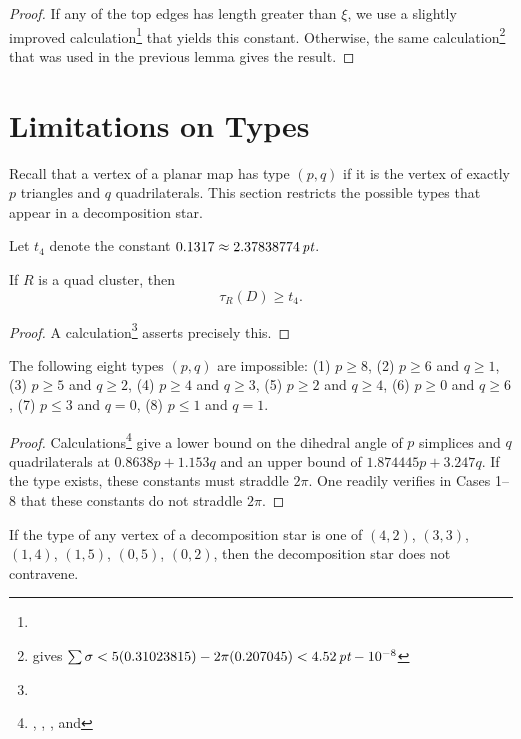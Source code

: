 \begin{proof}
If any of the top edges has length greater than $\xi$, we use a
slightly improved calculation\footnote{} that
yields this constant. Otherwise, the same
calculation\footnote{ gives
  $\sum\sigma < 5(0.31023815) - 2\pi(0.207045) < 4.52\,\hbox{\it pt} - 10^{-8}$
  } that was used
in the previous lemma gives the result.
\end{proof}


\section{Limitations on Types}

Recall that a vertex of a planar map has type $(p,q)$ if it is the
vertex of exactly $p$ triangles and $q$ quadrilaterals. This
section restricts the possible types that appear in a
decomposition star.

Let $t_4$ denote the constant $0.1317\approx 2.37838774\,\hbox{\it pt}$.

\begin{lemma}\label{lemma:0.1317} If $R$ is a quad cluster, then
   $$\tau_R(D) \ge t_4.$$
\end{lemma}

\begin{proof}
A calculation\footnote{} asserts precisely this.
\end{proof}

\begin{lemma} \label{lemma:pq-impossible}
The following eight types $(p,q)$ are impossible:
    (1)  $p\ge 8$,
    (2)  $p\ge 6$ and $q\ge 1$,
    (3)  $p \ge 5$ and $q\ge 2$,
    (4)  $p \ge 4$ and $q\ge 3$,
    (5)  $p \ge 2$ and $q\ge 4$,
    (6)  $p \ge 0$ and $q\ge 6$,
    (7)  $p \le 3$ and $q=0$,
    (8) $p \le 1$ and $q=1$.
\end{lemma}

\begin{proof}
Calculations\footnote{, ,
, and } give a lower bound on the
dihedral angle of $p$ simplices and $q$ quadrilaterals at
$0.8638p+1.153 q$ and an upper bound of $1.874445 p + 3.247 q$. If
the type exists, these constants must straddle $2\pi$. One readily
verifies in Cases 1--8 that these constants do not straddle
$2\pi$.
\end{proof}

\begin{lemma}
    \label{lemma:pq-types}
If the type of any vertex of a decomposition star is one of
$(4,2)$, $(3,3)$, $(1,4)$, $(1,5)$, $(0,5)$, $(0,2)$, %
then the decomposition star does not contravene.
\end{lemma}

